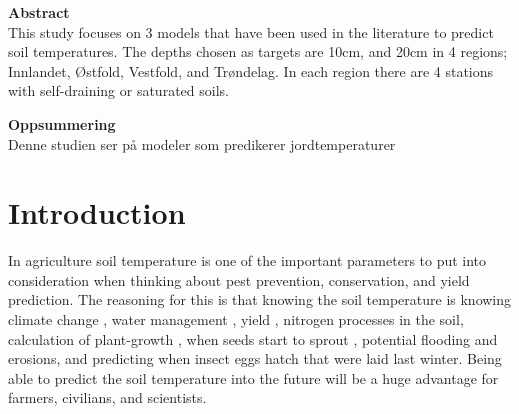 \begin{center}
\begin{minipage}[t]{0.45\textwidth}
	\centering
	\textbf{Abstract}\\
	This study focuses on 3 models that have been used in the literature to predict soil temperatures. The depths chosen as targets are 10cm, and 20cm in 4 regions; Innlandet, Østfold, Vestfold, and Trøndelag. In each region there are 4 stations with self-draining or saturated soils.
\end{minipage}
\begin{minipage}[t]{0.45\textwidth}
	\centering
	\textbf{Oppsummering}\\
	Denne studien ser på modeler som predikerer jordtemperaturer
\end{minipage}
\end{center}	





\section{Introduction}

In agriculture soil temperature is one of the important parameters to put into consideration when thinking about pest prevention, conservation, and yield prediction. The reasoning for this is that knowing the soil temperature is knowing climate change \cite{li_attention-aware_2022}, water management \cite{alizamir_advanced_2020}, yield \cite{sim_prediction_2020}, nitrogen processes \cite{rankinen_simple_2004} in the soil, calculation of plant-growth \cite{li_modeling_2020}, when seeds start to sprout \cite{li_modeling_2020}, potential flooding and erosions\cite{stuurop_influence_2022}, and predicting when insect eggs hatch that were laid last winter. Being able to predict the soil temperature into the future will be a huge advantage for farmers, civilians, and scientists.


